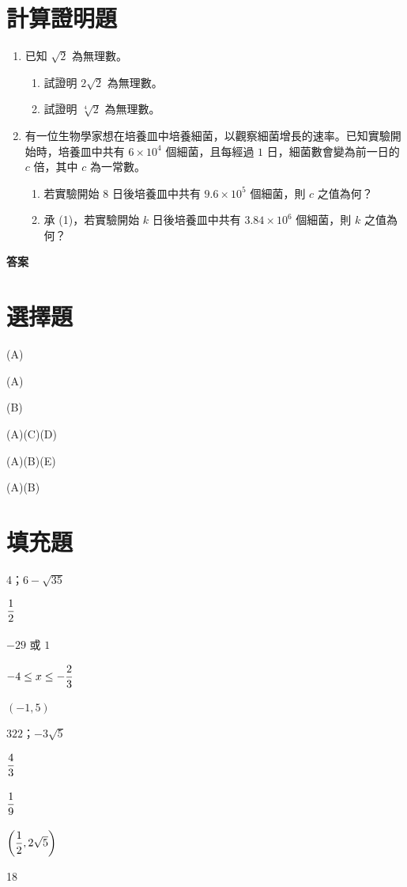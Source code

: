\documentclass[12pt]{article}
\newcommand*{\fraction}[2]{\rule[-.8\baselineskip]{0pt}{2\baselineskip}\dfrac{#1}{#2}}
\begin{document}
\section{計算證明題}
\begin{enumerate}[align=left,leftmargin=*,labelsep=.6em,parsep=0ex]
  \item 已知 $\sqrt{2}$ 為無理數。
  \begin{enumerate}[label=(\arabic*),align=left,leftmargin=*,labelsep=.4em]
    \item 試證明 $2\sqrt{2}$ 為無理數。
    \item 試證明 $\sqrt[4]{2}$ 為無理數。
  \end{enumerate}
  \newpage
  \item 有一位生物學家想在培養皿中培養細菌，以觀察細菌增長的速率。已知實驗開始時，培養皿中共有 $6 \times 10^4$ 個細菌，且每經過 $1$ 日，細菌數會變為前一日的 $c$ 倍，其中 $c$ 為一常數。
  \begin{enumerate}[label=(\arabic*),align=left,leftmargin=*,labelsep=.4em]
    \item 若實驗開始 8 日後培養皿中共有 $9.6 \times 10^5$ 個細菌，則 $c$ 之值為何？
    \item 承 (1)，若實驗開始 $k$ 日後培養皿中共有 $3.84 \times 10^6$ 個細菌，則 $k$ 之值為何？
  \end{enumerate}
\end{enumerate}

\newpage
{\bfseries\large 答案 \par}
\section*{選擇題}
\begin{enumerate*}[label=\arabic*.,itemjoin=\tab]
  \item (A)
  \item (A)
  \item (B)
  \item (A)(C)(D)
  \item (A)(B)(E)
  \item (A)(B)
\end{enumerate*}
\section*{填充題}
\begin{enumerate*}[label=\Alph*.,itemjoin=\tab]
  \item 4；$6-\sqrt{35}$
  \item $\fraction{1}{2}$
  \item $-29$ 或 $1$
  \item $-4 \leq x \leq -\fraction{2}{3}$
  \item $(-1,5)$
  \item $322$；$-3\sqrt{5}$
  \item $\fraction{4}{3}$
  \item $\fraction{1}{9}$
  \item $\biggl(\fraction{1}{2}, 2\sqrt{5}\biggr)$
  \item 18
\end{enumerate*}
\end{document}
